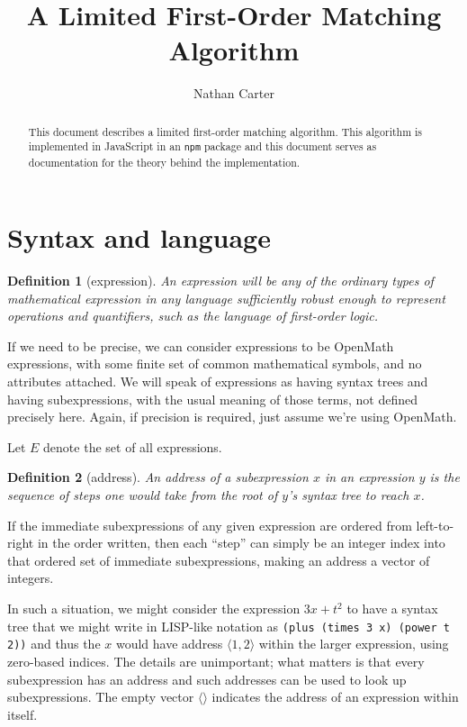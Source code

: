 \documentclass{article}
\newtheorem{dfn}{Definition}
\begin{document}
\title{A Limited First-Order Matching Algorithm}
\author{Nathan Carter}
\maketitle

\begin{abstract}%
This document describes a limited first-order matching algorithm.  This algorithm is implemented in JavaScript in an \texttt{npm} package and this document serves as documentation for the theory behind the implementation.
\end{abstract}


\section{Syntax and language}%

\begin{dfn}[expression]
An \emph{expression} will be any of the ordinary types of mathematical expression in any language sufficiently robust enough to represent operations and quantifiers, such as the language of first-order logic.
\end{dfn}

If we need to be precise, we can consider expressions to be OpenMath\cite{openmath} expressions, with some finite set of common mathematical symbols, and no attributes attached.  We will speak of expressions as having syntax trees and having subexpressions, with the usual meaning of those terms, not defined precisely here.  Again, if precision is required, just assume we're using OpenMath.

Let $E$ denote the set of all expressions.

\begin{dfn}[address]\label{D:address}
An \emph{address} of a subexpression $x$ in an expression $y$ is the sequence of steps one would take from the root of $y$'s syntax tree to reach $x$.
\end{dfn}

If the immediate subexpressions of any given expression are ordered from left-to-right in the order written, then each ``step'' can simply be an integer index into that ordered set of immediate subexpressions, making an address a vector of integers.

In such a situation, we might consider the expression $3x+t^2$ to have a syntax tree that we might write in LISP-like notation as \verb'(plus (times 3 x) (power t 2))' and thus the $x$ would have address $\langle1,2\rangle$ within the larger expression, using zero-based indices.  The details are unimportant; what matters is that every subexpression has an address and such addresses can be used to look up subexpressions.  The empty vector $\langle\rangle$ indicates the address of an expression within itself.
\end{document}
